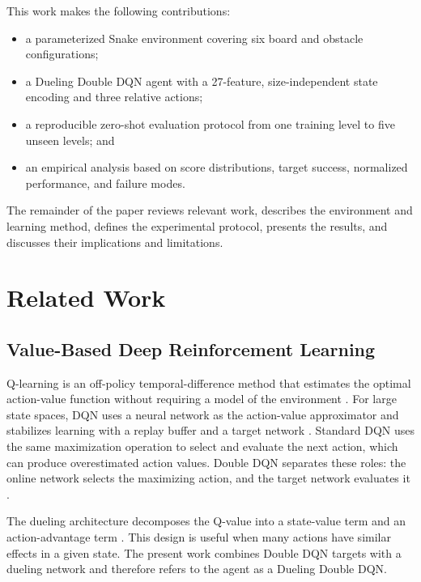 \documentclass[journal]{IEEEtran}
\newcommand{\methodname}{Dueling Double DQN}
\begin{document}
This work makes the following contributions:

\begin{itemize}
  \item a parameterized Snake environment covering six board and obstacle
  configurations;
  \item a \methodname{} agent with a 27-feature, size-independent state encoding
  and three relative actions;
  \item a reproducible zero-shot evaluation protocol from one training level to
  five unseen levels; and
  \item an empirical analysis based on score distributions, target success,
  normalized performance, and failure modes.
\end{itemize}

The remainder of the paper reviews relevant work, describes the environment and
learning method, defines the experimental protocol, presents the results, and
discusses their implications and limitations.

\section{Related Work}
\label{sec:related-work}

\subsection{Value-Based Deep Reinforcement Learning}

Q-learning is an off-policy temporal-difference method that estimates the
optimal action-value function without requiring a model of the environment
\cite{watkins1992qlearning,sutton2018reinforcement}. For large state spaces, DQN
uses a neural network as the action-value approximator and stabilizes learning
with a replay buffer and a target network \cite{mnih2015human}. Standard DQN
uses the same maximization operation to select and evaluate the next action,
which can produce overestimated action values.
Double DQN separates these roles: the online network selects the maximizing
action, and the target network evaluates it \cite{vanhasselt2016deep}.

The dueling architecture decomposes the Q-value into a state-value term and an
action-advantage term \cite{wang2016dueling}. This design is useful when many
actions have similar effects in a given state. The present work combines Double
DQN targets with a dueling network and therefore refers to the agent as a
Dueling Double DQN.
\end{document}

